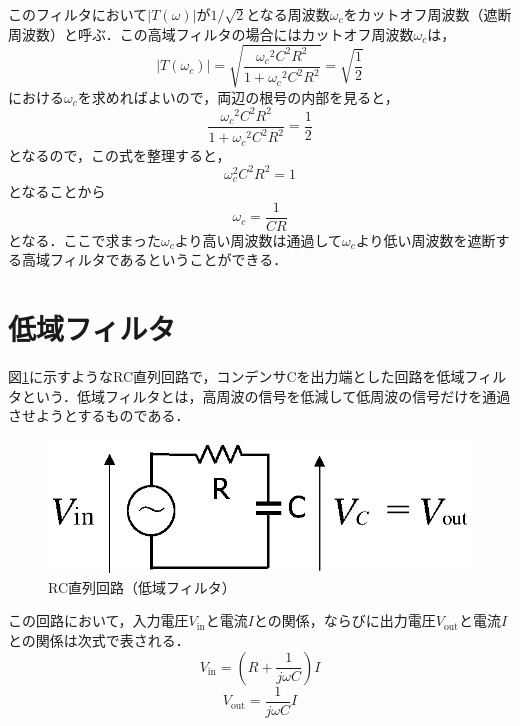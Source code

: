 このフィルタにおいて$|T(\omega)|$が$1/\sqrt{2}$となる周波数$\omega_c$をカットオフ周波数（遮断周波数）と呼ぶ．この高域フィルタの場合にはカットオフ周波数$\omega_c$は，
\begin{equation}
|T(\omega_c)|  =  \displaystyle \sqrt{\frac{{\omega_c}^2 C^2 R^2}{1 + {\omega_c}^2 C^2 R^2}}  =  \sqrt{\frac{1}{2}}
\end{equation}
における$\omega_c$を求めればよいので，両辺の根号の内部を見ると，
\begin{equation}
\frac{{\omega_c}^2 C^2 R^2}{1 + {\omega_c}^2 C^2 R^2}  =  \frac{1}{2}
\end{equation}
となるので，この式を整理すると，
\begin{equation}
\omega_c^2 C^2 R^2 = 1
\end{equation}
となることから
\begin{equation}
\omega_c = \frac{1}{CR}
\end{equation}
となる．ここで求まった$\omega_c$より高い周波数は通過して$\omega_c$より低い周波数を遮断する高域フィルタであるということができる．

\section{低域フィルタ}

図\ref{fig:lpf2}に示すようなRC直列回路で，コンデンサCを出力端とした回路を低域フィルタという．低域フィルタとは，高周波の信号を低減して低周波の信号だけを通過させようとするものである．
\begin{figure}[H]
\begin{center}
\includegraphics[width=.6\textwidth]{fig/lpf1.eps}
\end{center}
\caption{RC直列回路（低域フィルタ）}
\label{fig:lpf2}
\end{figure}

この回路において，入力電圧$V_\textrm{in}$と電流$I$との関係，ならびに出力電圧$V_\textrm{out}$と電流$I$との関係は次式で表される．
\begin{equation}
V_\textrm{in}=\left ( R + \frac{1}{j\omega C} \right ) I
\label{eqn:denki-lpf1}
\end{equation}
\begin{equation}
V_\textrm{out}= \frac{1}{j\omega C}  I
\label{eqn:denki-lpf2}
\end{equation}

